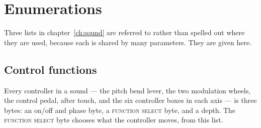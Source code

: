 \chapter{Enumerations}\label{ch:enums}

Three lists in chapter~\ref{ch:sound} are referred to rather than spelled out where they
are used, because each is shared by many parameters. They are given here.

\section{Control functions}\label{sec:controlfn}
Every controller in a sound --- the pitch bend lever, the two modulation wheels, the
control pedal, after touch, and the six controller boxes in each axis --- is three bytes:
an on/off and phase byte, a \textsc{function select} byte, and a depth. The
\textsc{function select} byte chooses what the controller moves, from this list.

